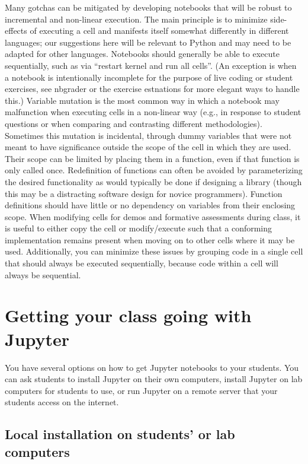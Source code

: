 \documentclass[]{book}
\begin{document}
Many gotchas can be mitigated by developing notebooks that will be
robust to incremental and non-linear execution. The main principle is to
minimize side-effects of executing a cell and manifests itself somewhat
differently in different languages; our suggestions here will be
relevant to Python and may need to be adapted for other languages.
Notebooks should generally be able to execute sequentially, such as via
``restart kernel and run all cells''. (An exception is when a notebook
is intentionally incomplete for the purpose of live coding or student
exercises, see nbgrader or the exercise estnations for more elegant ways
to handle this.) Variable mutation is the most common way in which a
notebook may malfunction when executing cells in a non-linear way (e.g.,
in response to student questions or when comparing and contrasting
different methodologies). Sometimes this mutation is incidental, through
dummy variables that were not meant to have significance outside the
scope of the cell in which they are used. Their scope can be limited by
placing them in a function, even if that function is only called once.
Redefinition of functions can often be avoided by parameterizing the
desired functionality as would typically be done if designing a library
(though this may be a distracting software design for novice
programmers). Function definitions should have little or no dependency
on variables from their enclosing scope. When modifying cells for demos
and formative assessments during class, it is useful to either copy the
cell or modify/execute such that a conforming implementation remains
present when moving on to other cells where it may be used.
Additionally, you can minimize these issues by grouping code in a single
cell that should always be executed sequentially, because code within a
cell will always be sequential.

\chapter{Getting your class going with Jupyter}\label{getting-going}

You have several options on how to get Jupyter notebooks to your
students. You can ask students to install Jupyter on their own
computers, install Jupyter on lab computers for students to use, or run
Jupyter on a remote server that your students access on the internet.

\section{Local installation on students' or lab
computers}\label{local-installation-on-students-or-lab-computers}
\end{document}
